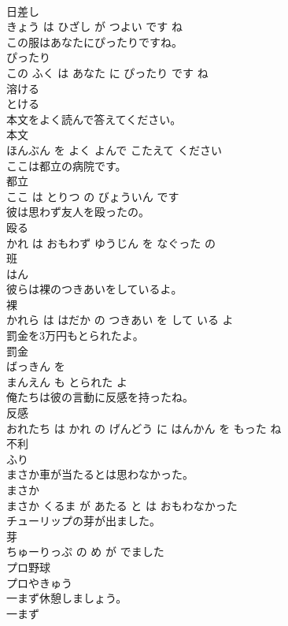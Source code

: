\documentclass[8pt]{extreport}
\begin{document}
\begin{CJK}{UTF8}{min}
\\	日差し 
\\	きょう は ひざし が つよい です ね			
\\	この服はあなたにぴったりですね。	
\\	ぴったり 
\\	この ふく は あなた に ぴったり です ね			
\\	溶ける	
\\	とける			
\\	本文をよく読んで答えてください。	
\\	本文 
\\	ほんぶん を よく よんで こたえて ください			
\\	ここは都立の病院です。	
\\	都立 
\\	ここ は とりつ の びょういん です			
\\	彼は思わず友人を殴ったの。	
\\	殴る 
\\	かれ は おもわず ゆうじん を なぐった の			
\\	班	
\\	はん			
\\	彼らは裸のつきあいをしているよ。	
\\	裸 
\\	かれら は はだか の つきあい を して いる よ			
\\	罰金を3万円もとられたよ。	
\\	罰金 
\\	ばっきん を 
\\	まんえん も とられた よ			
\\	俺たちは彼の言動に反感を持ったね。	
\\	反感 
\\	おれたち は かれ の げんどう に はんかん を もった ね			
\\	不利	
\\	ふり			
\\	まさか車が当たるとは思わなかった。	
\\	まさか 
\\	まさか くるま が あたる と は おもわなかった			
\\	チューリップの芽が出ました。	
\\	芽 
\\	ちゅーりっぷ の め が でました			
\\	プロ野球	
\\	プロやきゅう			
\\	一まず休憩しましょう。	
\\	一まず 

\end{CJK}
\end{document}

